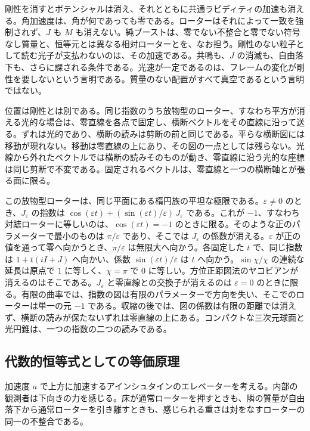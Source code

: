 \documentclass[a4paper]{article}
\begin{document}
剛性を消すとポテンシャルは消え、それとともに共通ラピディティの加速も消える。角加速度は、角が何であっても零である。ローターはそれによって一致を強制されず、$J$ も $M$ も消えない。純ブーストは、零でない不整合と零でない符号なし質量と、恒等元とは異なる相対ローターとを、なお担う。剛性のない粒子として読む光子が支払わないのは、その加速である。共鳴も、$J$ の消滅も、自由落下も、さらに課される条件である。光速が一定であるのは、フレームの変化が剛性を要しないという言明である。質量のない配置がすべて真空であるという言明ではない。

位置は剛性とは別である。同じ指数のうち放物型のローター、すなわち平方が消える光的な場合は、零直線を各点で固定し、横断ベクトルをその直線に沿って送る。ずれは光的であり、横断の読みは剪断の前と同じである。平らな横断図には移動が現れない。移動は零直線の上にあり、その図の一点としては残らない。光線から外れたベクトルでは横断の読みそのものが動き、零直線に沿う光的な座標は同じ剪断で不変である。固定されるベクトルは、零直線と一つの横断軸とが張る面に限る。

この放物型ローターは、同じ平面にある楕円族の平坦な極限である。$\varepsilon\neq 0$ のとき、$J_\varepsilon$ の指数は $\cos(\varepsilon t)+(\sin(\varepsilon t)/\varepsilon)\,J_\varepsilon$ である。これが $-1$、すなわち対蹠ローターに等しいのは、$\cos(\varepsilon t)=-1$ のときに限る。そのような正のパラメーターで最小のものは $\pi/\varepsilon$ であり、そこでは $J_\varepsilon$ の係数が消える。$\varepsilon$ が正の値を通って零へ向かうとき、$\pi/\varepsilon$ は無限大へ向かう。各固定した $t$ で、同じ指数は $1+t(iI+J)$ へ向かい、係数 $\sin(\varepsilon t)/\varepsilon$ は $t$ へ向かう。$\sin\chi/\chi$ の連続な延長は原点で $1$ に等しく、$\chi=\pi$ で $0$ に等しい。方位正距図法のヤコビアンが消えるのはそこである。$J_\varepsilon$ と零直線との交換子が消えるのは $\varepsilon=0$ のときに限る。有限の曲率では、指数の図は有限のパラメーターで方向を失い、そこでのローターは単一の元 $-1$ である。収縮の後では、図の係数は有限の距離では消えず、横断の読みが保たないずれは零直線の上にある。コンパクトな三次元球面と光円錐は、一つの指数の二つの読みである。

\subsection{代数的恒等式としての等価原理}

加速度 $a$ で上方に加速するアインシュタインのエレベーターを考える。内部の観測者は下向きの力を感じる。床が通常ローターを押すときも、隣の質量が自由落下から通常ローターを引き離すときも、感じられる重さは対をなすローターの同一の不整合である。
\end{document}
